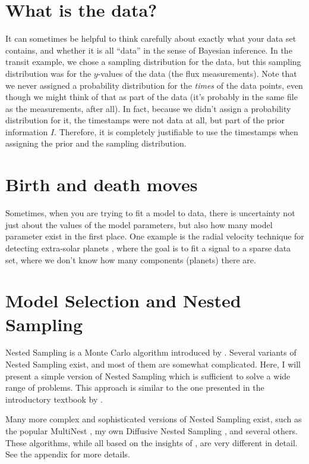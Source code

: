 \section{What is the data?}
It can sometimes be helpful to think carefully about exactly what your data set
contains, and whether it is all ``data'' in the sense of Bayesian inference.
In the transit example, we chose a sampling distribution for the data, but this
sampling distribution was for the $y$-values of the data
(the flux measurements). Note that we never assigned a probability distribution
for the {\it times} of the data points, even though we might think of that as
part of the data (it's probably in the same file as the measurements, after all).
In fact, because we didn't assign a probability distribution for it, the
timestamps were not data at all, but part of the prior information $I$.
Therefore, it is completely justifiable to use the timestamps when assigning
the prior and the sampling distribution.




\section{Birth and death moves}
Sometimes, when you are trying to fit a model to data, there is uncertainty
not just about the values of the model parameters, but also how many model
parameter exist in the first place. One example is
the radial velocity technique for detecting extra-solar planets
\citep{gregory}, where the goal is to fit a signal to a sparse data set, where
we don't know how many components (planets) there are.



\section{Model Selection and Nested Sampling}
Nested Sampling is a Monte Carlo algorithm introduced by \citet{skilling}.
Several variants of Nested Sampling exist, and most of them are somewhat
complicated. Here, I will present a simple version of Nested Sampling which
is sufficient to solve a wide range of problems. This approach is similar to
the one presented in the introductory textbook by \citet{sivia}.

Many more complex and sophisticated versions of
Nested Sampling exist, such as the popular MultiNest \citep{multinest},
my own Diffusive Nested Sampling \citep{dnest}, and several others. These
algorithms, while all based on the insights of \citet{skilling}, are very
different in detail. See the appendix for more details.

